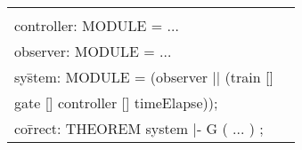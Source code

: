 \documentclass{llncs}
\begin{document}
\begin{figure}[htb!]
\begin{tt}
\begin{tabular}{ll}
\begin{minipage}{2in}
\begin{tabbing}
\\ \>
controller: MODULE = $\ldots$
\\ \>
observer: MODULE = $\ldots$
\\ \>
sy\=stem: MODULE = (observer || (train []
\\ \> \>
  gate [] controller [] timeElapse));
\\ \>
co\=rrect: THEOREM system |- G ( ... ) ;
%


\end{tabbing}
\end{minipage}
\end{tabular}
\end{tt}
\end{figure}
\end{document}
